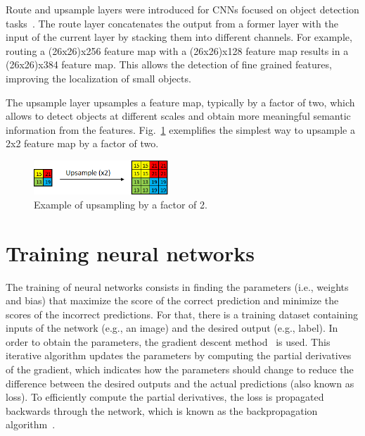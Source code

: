 Route and upsample layers were introduced for CNNs focused on object detection tasks~\cite{Redmon2018YOLOv3AI}. The route layer concatenates the output from a former layer with the input of the current layer by stacking them into different channels. For example, routing a (26x26)x256 feature map with a (26x26)x128 feature map results in a (26x26)x384 feature map. This allows the detection of fine grained features, improving the localization of small objects. 

The upsample layer upsamples a feature map, typically by a factor of two, which allows to detect objects at different scales and obtain more meaningful semantic information from the features. Fig.~\ref{fig:upsample} exemplifies the simplest way to upsample a 2x2 feature map by a factor of two. 

\begin{figure}[!htb]
  \centering
  \includegraphics[width=0.45\textwidth]{Figures/upsample.png}
  \caption{Example of upsampling by a factor of 2.}
  \label{fig:upsample}
\end{figure}
\vspace{-0.4cm}

\section{Training neural networks}
\label{section:training}

The training of neural networks consists in finding the parameters (i.e., weights and bias) that maximize the score of the correct prediction and minimize the scores of the incorrect predictions. For that, there is a training dataset containing inputs of the network (e.g., an image) and the desired output (e.g., label). In order to obtain the parameters, the gradient descent method~\cite{sze:dnn_survey} is used. This iterative algorithm updates the parameters by computing the partial derivatives of the gradient, which indicates how the parameters should change to reduce the difference between the desired outputs and the actual predictions (also known as loss). To efficiently compute the partial derivatives, the loss is propagated backwards through the network, which is known as the backpropagation algorithm~\cite{sze:dnn_survey}.  

